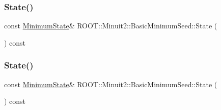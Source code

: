 \subsubsection{\texorpdfstring{State()}{State()}\hspace{0.1cm}{\footnotesize\ttfamily [2/3]}}
{\footnotesize\ttfamily const \mbox{\hyperlink{classROOT_1_1Minuit2_1_1MinimumState}{Minimum\+State}}\& R\+O\+O\+T\+::\+Minuit2\+::\+Basic\+Minimum\+Seed\+::\+State (\begin{DoxyParamCaption}{ }\end{DoxyParamCaption}) const\hspace{0.3cm}{\ttfamily [inline]}}

\mbox{\label{classROOT_1_1Minuit2_1_1BasicMinimumSeed_a92e671b9a963d83076238c2e2b283e7c}} 
\subsubsection{\texorpdfstring{State()}{State()}\hspace{0.1cm}{\footnotesize\ttfamily [3/3]}}
{\footnotesize\ttfamily const \mbox{\hyperlink{classROOT_1_1Minuit2_1_1MinimumState}{Minimum\+State}}\& R\+O\+O\+T\+::\+Minuit2\+::\+Basic\+Minimum\+Seed\+::\+State (\begin{DoxyParamCaption}{ }\end{DoxyParamCaption}) const\hspace{0.3cm}{\ttfamily [inline]}}

